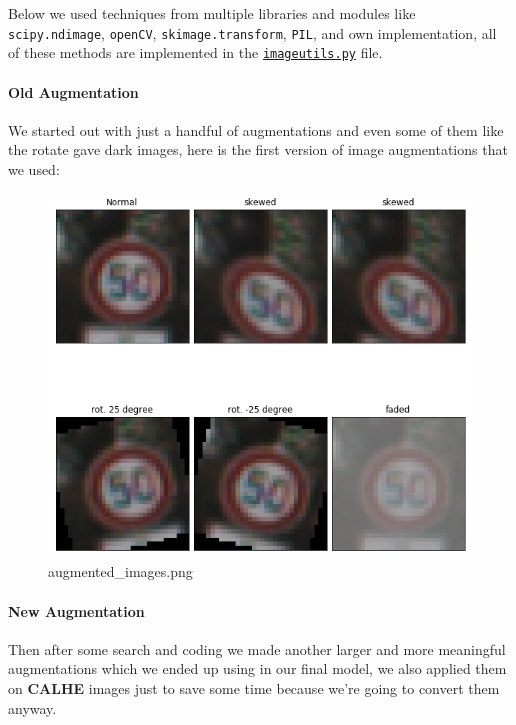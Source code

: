 \documentclass[11pt]{article}
\makeatletter
\def\maxwidth{\ifdim\Gin@nat@width>\linewidth\linewidth
    \else\Gin@nat@width\fi}
\let\Oldincludegraphics\includegraphics
\renewcommand{\includegraphics}[1]{\Oldincludegraphics[width=.8\maxwidth]{#1}}
\makeatother
\begin{document}
Below we used techniques from multiple libraries and modules like
\texttt{scipy.ndimage}, \texttt{openCV}, \texttt{skimage.transform},
\texttt{PIL}, and own implementation, all of these methods are
implemented in the \href{imageutils.py}{\texttt{imageutils.py}} file.

\hypertarget{old-augmentation}{%
\paragraph{Old Augmentation}\label{old-augmentation}}

We started out with just a handful of augmentations and even some of
them like the rotate gave dark images, here is the first version of
image augmentations that we used:

\begin{figure}
\centering
\includegraphics{./assets/augmented_images.png}
\caption{augmented\_images.png}
\end{figure}

\hypertarget{new-augmentation}{%
\paragraph{New Augmentation}\label{new-augmentation}}

Then after some search and coding we made another larger and more
meaningful augmentations which we ended up using in our final model, we
also applied them on \textbf{CALHE} images just to save some time
because we're going to convert them anyway.
\end{document}
